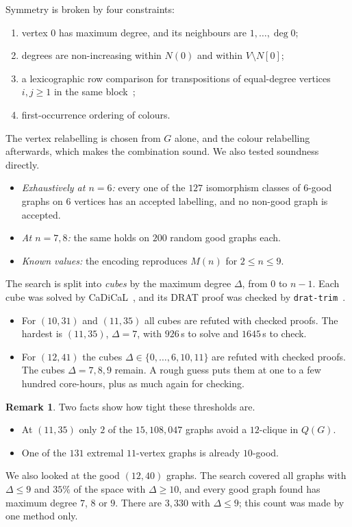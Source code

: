 \documentclass[11pt]{amsart}
\theoremstyle{definition}
\newtheorem{remark}[theorem]{Remark}
\newcommand{\M}{M}
\begin{document}
Symmetry is broken by four constraints:
\begin{enumerate}
\item vertex $0$ has maximum degree, and its neighbours are $1,\dots,\deg 0$;
\item degrees are non-increasing within $N(0)$ and within $V\setminus N[0]$;
\item a lexicographic row comparison for transpositions of equal-degree vertices
  $i,j\ge1$ in the same block~\cite{CMPS19};
\item first-occurrence ordering of colours.
\end{enumerate}
The vertex relabelling is chosen from $G$ alone, and the colour relabelling afterwards, which
makes the combination sound. We also tested soundness directly.
\begin{itemize}
\item \emph{Exhaustively at $n=6$:} every one of the $127$ isomorphism classes of $6$-good
  graphs on $6$ vertices has an accepted labelling, and no non-good graph is accepted.
\item \emph{At $n=7,8$:} the same holds on $200$ random good graphs each.
\item \emph{Known values:} the encoding reproduces $\M(n)$ for $2\le n\le 9$.
\end{itemize}

The search is split into \emph{cubes} by the maximum degree $\Delta$, from $0$ to $n-1$.
Each cube was solved by CaDiCaL~\cite{CaDiCaL}, and its DRAT proof was checked by
\texttt{drat-trim}~\cite{dratTrim}.
\begin{itemize}
\item For $(10,31)$ and $(11,35)$ all cubes are refuted with checked proofs. The hardest is
  $(11,35)$, $\Delta=7$, with $926$\,s to solve and $1645$\,s to check.
\item For $(12,41)$ the cubes $\Delta\in\{0,\dots,6,10,11\}$ are refuted with checked proofs.
  The cubes $\Delta=7,8,9$ remain. A rough guess puts them at one to a few hundred
  core-hours, plus as much again for checking.
\end{itemize}

\begin{remark}
Two facts show how tight these thresholds are.
\begin{itemize}
\item At $(11,35)$ only $2$ of the $15{,}108{,}047$ graphs avoid a $12$-clique in $Q(G)$.
\item One of the $131$ extremal $11$-vertex graphs is already $10$-good.
\end{itemize}
We also looked at the good $(12,40)$ graphs. The search covered all graphs with $\Delta\le9$
and $35\%$ of the space with $\Delta\ge10$, and every good graph found has maximum degree
$7$, $8$ or $9$. There are $3{,}330$ with $\Delta\le9$; this count was made by one method only.
\end{remark}
\end{document}
